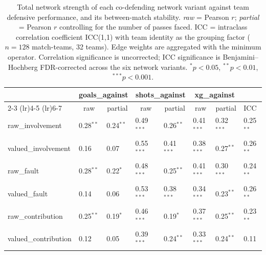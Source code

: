 

\begin{table}[H]
\centering
\caption{Total network strength of each co-defending network variant against team
defensive performance, and its between-match stability. \textit{raw} = Pearson $r$;
\textit{partial} = Pearson $r$ controlling for the number of passes faced. ICC =
intraclass correlation coefficient ICC(1,1) with team identity as the grouping factor
($n=128$ match-teams, 32 teams). Edge weights are aggregated with the minimum
operator. Correlation significance is uncorrected; ICC significance is
Benjamini--Hochberg FDR-corrected across the six network variants.
$^{*}p<0.05$, $^{**}p<0.01$, $^{***}p<0.001$.}
\label{tab:team_level_table}
\begin{tabular}{lllllll l}
\toprule
& \multicolumn{2}{c}{goals\_against}
& \multicolumn{2}{c}{shots\_against}
& \multicolumn{2}{c}{xg\_against} & \\
\cmidrule(lr){2-3} \cmidrule(lr){4-5} \cmidrule(lr){6-7}
& \multicolumn{1}{c}{raw} & \multicolumn{1}{c}{partial}
& \multicolumn{1}{c}{raw} & \multicolumn{1}{c}{partial}
& \multicolumn{1}{c}{raw} & \multicolumn{1}{c}{partial}
& \multirow{-2}{*}{ICC} \\
\midrule
raw\_involvement     & 0.28$^{**}$ & 0.24$^{**}$ & 0.49$^{***}$ & 0.26$^{**}$  & 0.41$^{***}$ & 0.32$^{***}$ & 0.25$^{**}$ \\
valued\_involvement  & 0.16        & 0.07        & 0.55$^{***}$ & 0.41$^{***}$ & 0.38$^{***}$ & 0.27$^{**}$  & 0.26$^{**}$ \\
raw\_fault           & 0.28$^{**}$ & 0.22$^{*}$  & 0.48$^{***}$ & 0.25$^{**}$  & 0.41$^{***}$ & 0.30$^{***}$ & 0.24$^{**}$ \\
valued\_fault        & 0.14        & 0.06        & 0.53$^{***}$ & 0.38$^{***}$ & 0.34$^{***}$ & 0.23$^{**}$  & 0.26$^{**}$ \\
raw\_contribution    & 0.25$^{**}$ & 0.19$^{*}$  & 0.46$^{***}$ & 0.19$^{*}$   & 0.37$^{***}$ & 0.25$^{**}$  & 0.23$^{**}$ \\
valued\_contribution & 0.12        & 0.05        & 0.39$^{***}$ & 0.24$^{**}$  & 0.33$^{***}$ & 0.24$^{**}$  & 0.11 \\
\bottomrule
\end{tabular}
\end{table}



